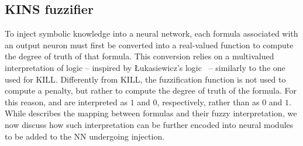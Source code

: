 \subsection{KINS fuzzifier}\label{subsec:kins-fuzzifier}
%

%
To inject symbolic knowledge into a neural network, each formula associated with an output neuron must first be converted into a real-valued function to compute the degree of truth of that formula.
%
This conversion relies on a multivalued interpretation of logic -- inspired by \L{}ukasiewicz's logic~\cite{DBLP:journals/jsyml/Hay63} -- similarly to the one used for \gls{KILL}.
%
Differently from \gls{KILL}, the fuzzification function is not used to compute a penalty, but rather to compute the degree of truth of the formula.
%
For this reason,  and  are interpreted as $1$ and $0$, respectively, rather than as $0$ and $1$.
%
While  describes the mapping between formulas and their fuzzy interpretation, we now discuss how such interpretation can be further encoded into neural modules to be added to the \gls{NN} undergoing injection.


